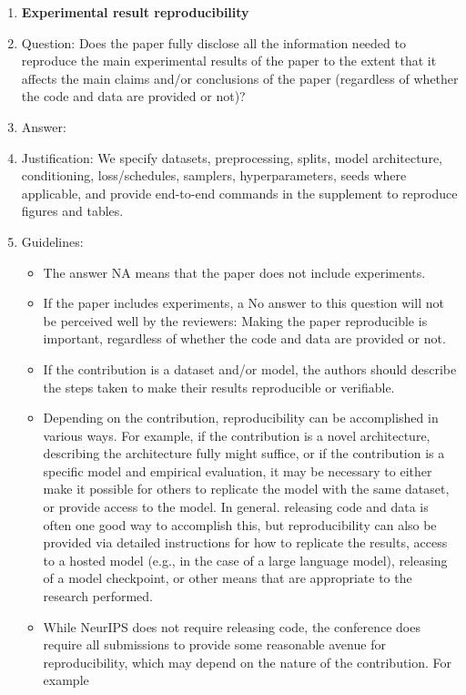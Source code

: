 \documentclass{article}
\begin{document}
\begin{enumerate}
    \item {\bf Experimental result reproducibility}
    \item[] Question: Does the paper fully disclose all the information needed to reproduce the main experimental results of the paper to the extent that it affects the main claims and/or conclusions of the paper (regardless of whether the code and data are provided or not)?
    \item[] Answer: \answerYes{}
    \item[] Justification: We specify datasets, preprocessing, splits, model architecture, conditioning, loss/schedules, samplers, hyperparameters, seeds where applicable, and provide end-to-end commands in the supplement to reproduce figures and tables.
    \item[] Guidelines:
    \begin{itemize}
        \item The answer NA means that the paper does not include experiments.
        \item If the paper includes experiments, a No answer to this question will not be perceived well by the reviewers: Making the paper reproducible is important, regardless of whether the code and data are provided or not.
        \item If the contribution is a dataset and/or model, the authors should describe the steps taken to make their results reproducible or verifiable. 
        \item Depending on the contribution, reproducibility can be accomplished in various ways. For example, if the contribution is a novel architecture, describing the architecture fully might suffice, or if the contribution is a specific model and empirical evaluation, it may be necessary to either make it possible for others to replicate the model with the same dataset, or provide access to the model. In general. releasing code and data is often one good way to accomplish this, but reproducibility can also be provided via detailed instructions for how to replicate the results, access to a hosted model (e.g., in the case of a large language model), releasing of a model checkpoint, or other means that are appropriate to the research performed.
        \item While NeurIPS does not require releasing code, the conference does require all submissions to provide some reasonable avenue for reproducibility, which may depend on the nature of the contribution. For example
        \begin{enumerate}

\end{enumerate}
\end{itemize}
\end{enumerate}
\end{document}
